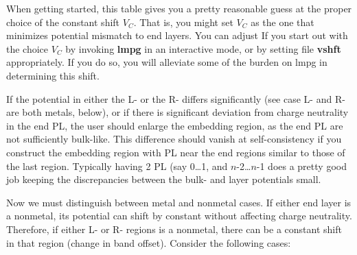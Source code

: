\documentclass{article}
\begin{document}
When getting started, this table gives you a pretty reasonable
guess at the proper choice of the constant shift $V_C$.  That is,
you might set $V_C$ as the one that minimizes potential mismatch
to end layers.  You can adjust If you start out with the choice
$V_C$ by invoking {\bf lmpg} in an interactive mode, or by
setting file {\bf vshft} appropriately.  If you do so, you will
alleviate some of the burden on lmpg in determining this shift.

If the potential in either the L- or the R- differs significantly
(see case L- and R- are both metals, below), or if there is
significant deviation from charge neutrality in the end PL, the
user should enlarge the embedding region, as the end PL are not
sufficiently bulk-like.  This difference should vanish at
self-consistency if you construct the embedding region with PL
near the end regions similar to those of the last region.
Typically having 2 PL (say 0\dots{}1, and $n$-2\dots$n$-1 does a
pretty good job keeping the discrepancies between the bulk- and
layer potentials small.

Now we must distinguish between metal and nonmetal
cases.  If either end layer is a nonmetal, its potential can shift by
constant without affecting charge neutrality.  Therefore, if either L-
or R- regions is a nonmetal, there can be a constant shift in that
region (change in band offset).  Consider the following cases:
\end{document}
